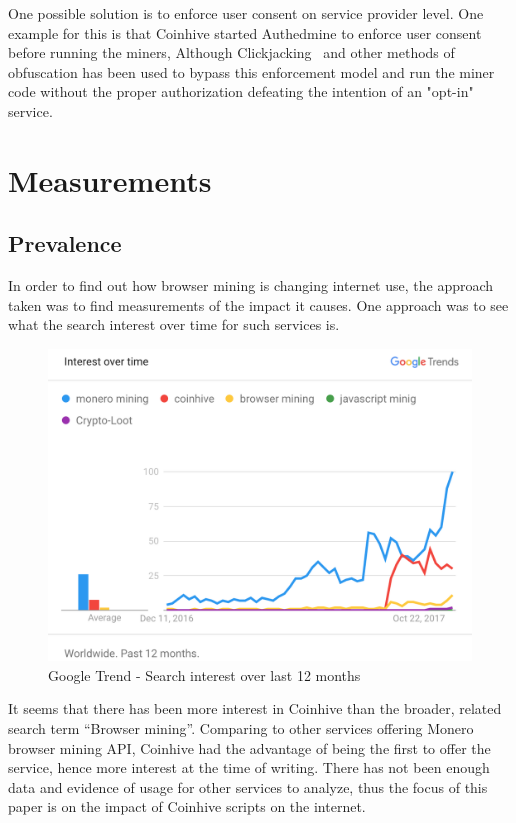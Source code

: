 One possible solution is to enforce user consent on service provider level. One example for this is that Coinhive started Authedmine to enforce user consent before running the miners, Although Clickjacking~\cite{rydstedt2010busting} and other methods of obfuscation has been used to bypass this enforcement model and run the miner code without the proper authorization defeating the intention of an "opt-in" service.




\section{Measurements}

\subsection{Prevalence}

In order to find out how browser mining is changing internet use, the approach taken was to find measurements of the impact it causes. One approach was to see what the search interest over time for such services is. 

\begin{figure}[t]
\centering
\includegraphics[width=\linewidth]{figures/usage_over_time2.png}
\caption{Google Trend - Search interest over last 12 months}
\end{figure}

It seems that there has been more interest in Coinhive than the broader, related search term ``Browser mining''. Comparing to other services offering Monero browser mining API, Coinhive had the advantage of being the first to offer the service, hence more interest at the time of writing. There has not been enough data and evidence of usage for other services to analyze, thus the focus of this paper is on the impact of Coinhive scripts on the internet. 


